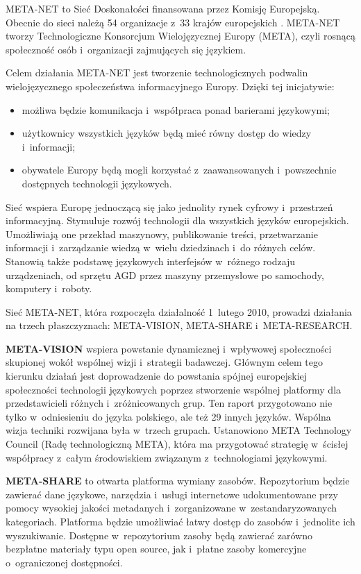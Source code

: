 \begin{multicols}{2} 

META-NET to Sieć Doskonałości finansowana przez Komisję
Europejską. Obecnie do sieci należą 54 organizacje z~33 krajów
europejskich \cite{rehm2011}. META-NET tworzy Technologiczne Konsorcjum
Wielojęzycznej Europy (META), czyli rosnącą społeczność osób
i~organizacji zajmujących się językiem. 

Celem działania META-NET jest tworzenie technologicznych podwalin
wielojęzycznego społeczeństwa informacyjnego Europy. Dzięki tej
inicjatywie: 

\begin{itemize} \item możliwa będzie komunikacja i~współpraca
ponad barierami językowymi; \item użytkownicy wszystkich języków
będą mieć równy dostęp do wiedzy i~informacji; \item obywatele
Europy będą mogli korzystać z~zaawansowanych i~powszechnie
dostępnych technologii językowych. \end{itemize} 

Sieć wspiera Europę jednoczącą się jako jednolity rynek cyfrowy
i~przestrzeń informacyjną. Stymuluje rozwój technologii dla
wszystkich języków europejskich. Umożliwiają one przekład
maszynowy, publikowanie treści, przetwarzanie informacji
i~zarządzanie wiedzą w~wielu dziedzinach i~do różnych celów.
Stanowią także podstawę językowych interfejsów w~różnego
rodzaju urządzeniach, od sprzętu AGD przez maszyny przemysłowe po
samochody, komputery i~roboty. 

Sieć META-NET, która rozpoczęła działalność 1~lutego 2010,
prowadzi działania na trzech płaszczyznach: META-VISION,
META-SHARE i~META-RESEARCH. 

\textbf{META-VISION} wspiera powstanie dynamicznej i~wpływowej
społeczności skupionej wokół wspólnej wizji i~strategii
badawczej. Głównym celem tego kierunku działań jest doprowadzenie
do powstania spójnej europejskiej społeczności technologii
językowych poprzez stworzenie wspólnej platformy dla przedstawicieli
różnych i~zróżnicowanych grup. Ten raport przygotowano nie tylko
w~odniesieniu do języka polskiego, ale też 29 innych języków.
Wspólna wizja techniki rozwijana była w~trzech grupach. Ustanowiono
META Technology Council (Radę technologiczną META), która ma
przygotować strategię w~ścisłej współpracy z~całym
środowiskiem związanym z~technologiami językowymi. 

\textbf{META-SHARE} to otwarta platforma wymiany zasobów.
Repozytorium będzie zawierać dane językowe, narzędzia i~usługi
internetowe udokumentowane przy pomocy wysokiej jakości metadanych
i~zorganizowane w~zestandaryzowanych kategoriach. Platforma będzie
umożliwiać łatwy dostęp do zasobów i~jednolite ich wyszukiwanie.
Dostępne w~repozytorium zasoby będą zawierać zarówno bezpłatne
materiały typu open source, jak i~płatne zasoby komercyjne
o~ograniczonej dostępności. 


\end{multicols}
